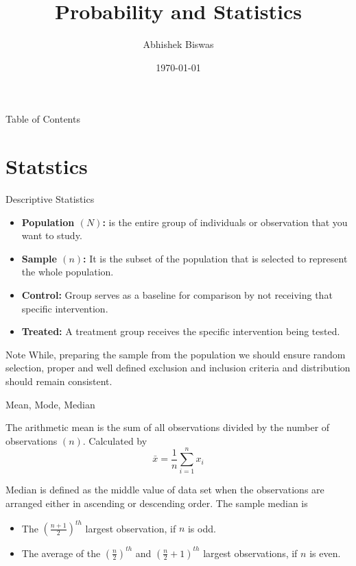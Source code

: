 \documentclass{beamer}
\title{Probability and Statistics}
\author{Abhishek Biswas}
\date{\today}
\begin{document}
\maketitle
\begin{frame}{Table of Contents}
    \tableofcontents
\end{frame}
\section{Statstics}
\begin{frame}{Descriptive Statistics}
\begin{itemize}
    \item \textbf{Population $(N)$:} is the entire group of individuals or observation that you want to study.
    \item \textbf{Sample $(n)$:} It is the subset of the population that is selected to represent the whole population.
    \item \textbf{Control:} Group serves as a baseline for comparison by not receiving that specific intervention.
    \item \textbf{Treated:} A treatment group receives the specific intervention being tested.
\end{itemize}
    \vspace{0.5cm}

    \begin{alertblock}{Note}
    While, preparing the sample from the population we should ensure random selection, proper and well defined exclusion and inclusion criteria and distribution should remain consistent.
    \end{alertblock}
\end{frame}
\begin{frame}{Mean, Mode, Median}

    The arithmetic mean is the sum of all observations divided by the number of observations $(n)$. Calculated by
    \begin{equation}
        \bar{x}=\frac{1}{n}\sum_{i=1}^{n} x_i
    \end{equation}

    Median is defined as the middle value of data set when the observations are arranged either in ascending  or descending order. The sample median is \vspace{0.3cm}
    \begin{itemize}
        \item The $(\frac{n+1}{2})^{th}$ largest observation, if $n$ is odd.\vspace{0.3cm}
        \item The average of the $(\frac{n}{2})^{th}$ and $(\frac{n}{2}+1)^{th}$ largest observations, if $n$ is even. 
    \end{itemize}

 
    \end{frame}
    
\end{document}
